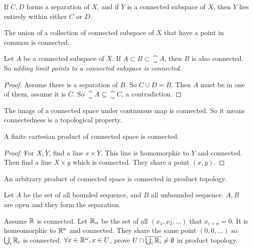 \begin{theorem}
    If $C,D$ forms a separation of $X$, and if $Y$ is a connected subspace of $X$, then $Y$ lies entirely within either $C$ or $D$.
\end{theorem}

\begin{theorem}
The union of a collection of connected subspace of $X$ that have a point in common is connected.    
\end{theorem}

\begin{theorem}
Let $A$ be a connected subspace of $X$. If $A \subset B \subset \closure{A}$, then $B$ is also connected. So \emph{adding limit points to a connected subspace is connected}.
\end{theorem}
\begin{proof}
    Assume there is a separation of $B$. So $C \cup D = B$. Then $A$ must be in one of them, assume it is $C$. So $\closure{A} \subseteq \closure{C}$, a contradiction.
\end{proof}

\begin{theorem}\label{cont_func_from_cont_to_cont}
The image of a connected space under continuous map is connected. So it means connectedness is a topological property.
\end{theorem}

\begin{theorem}
A finite cartesian product of connected space is connected.
\end{theorem}
\begin{proof}
For $X,Y$, find a line $x \times Y$. This line is homomorphic to $Y$ and connected. Then find a line $X \times y$ which is connected. They share a point $(x,y)$.
\end{proof}

\begin{theorem}
    An arbitrary product of connected space is connected in product topology.    
\end{theorem}


\begin{example}
    Let $A$ be the set of all bounded sequence, and $B$ all unbounded sequence. $A,B$ are open and they form the separation.
\end{example}

\begin{example}
    Assume $\mathbb{R}$ is connected. Let $\mathbb{R}_n$ be the set of all $(x_1, x_2, ...)$ that $x_{i > n} = 0$. It is homeomorphic to $\mathbb{R}^n$ and connected. They share the same point $(0,0,...)$ so $\bigcup_i \mathbb{R}_i$ is connected. $\forall x \in \mathbb{R}^\omega, x \in U$, prove $U \cap \overline{\bigcup_i \mathbb{R}_i} \neq \emptyset$ in product topology.
\end{example}


